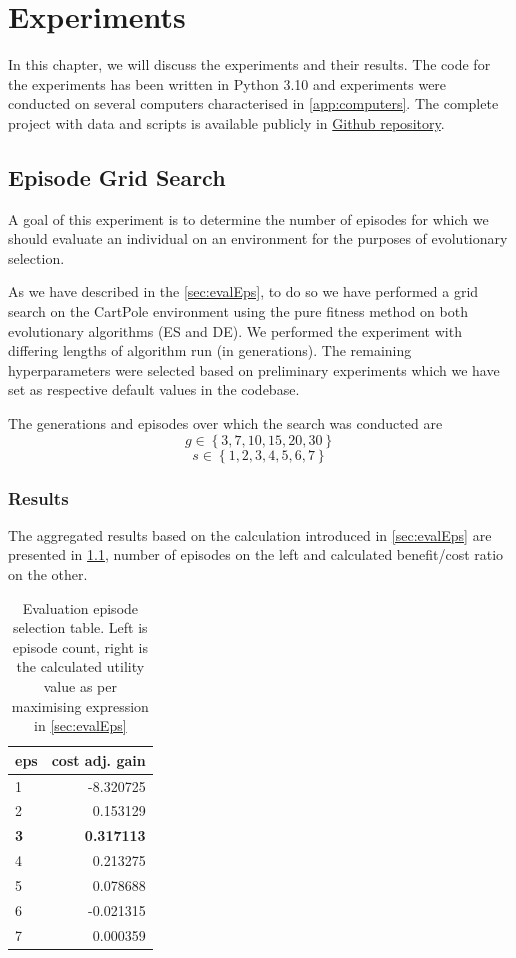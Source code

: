 \chapter{Experiments}
\label{ch:experiments}
In this chapter, we will discuss the experiments and their results. The code for the experiments has been written in Python 3.10 and experiments were conducted on several computers characterised in  \cref{app:computers}. The complete project with data and scripts is available publicly in \href{https://github.com/Schkliba/MastersThesis}{Github repository}.
\section{Episode Grid Search}
A goal of this experiment is to determine the number of episodes for which we should evaluate an individual on an environment for the purposes of evolutionary selection.

As we have described in the \cref{sec:evalEps}, to do so we have performed a grid search on the CartPole environment using the pure fitness method on both evolutionary algorithms (ES and DE). We performed the experiment with differing lengths of algorithm run (in generations). The remaining hyperparameters were selected based on preliminary experiments which we have set as respective default values in the codebase. 

The generations and episodes over which the search was conducted are  $$g\in\left\lbrace 3, 7, 10, 15, 20, 30\right\rbrace$$
$$s\in\left\lbrace 1,2,3,4,5,6,7\right\rbrace$$
\subsection{Results}
The aggregated results based on the calculation introduced in \cref{sec:evalEps} are presented in \cref{tab:epsEval}, number of episodes on the left and calculated benefit/cost ratio on the other.


\begin{table}[h]
	\centering
	\scriptsize
	\setlength{\tabcolsep}{4pt}
	\renewcommand{\arraystretch}{1.15}
\begin{tabular}{l|r}
	\toprule
	      
	eps &    cost adj. gain \\
	\midrule
	1   & -8.320725 \\
	2   &  0.153129 \\
\textbf{3}   &  \textbf{0.317113} \\
	4   &  0.213275 \\
	5   &  0.078688 \\
	6   & -0.021315 \\
	7   &  0.000359 \\
	\bottomrule
\end{tabular}
\caption{Evaluation episode selection table. Left is episode count, right is the calculated utility value as per maximising expression in \ref{sec:evalEps}}
\label{tab:epsEval}
\end{table}  


